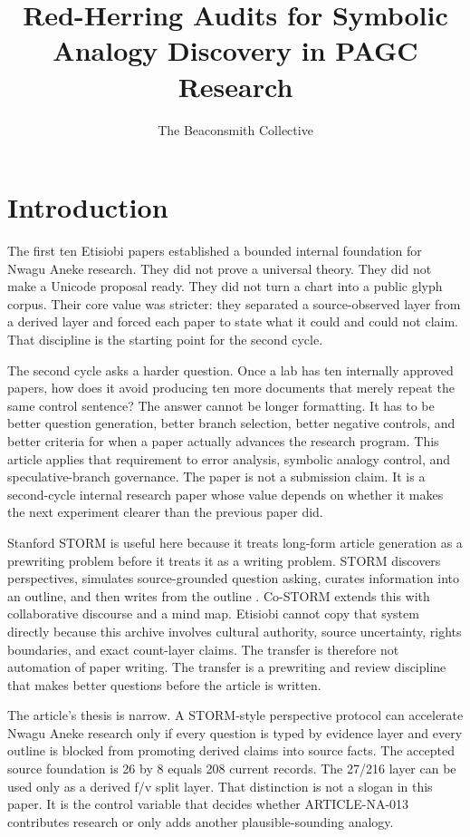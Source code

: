 \documentclass[sigconf,nonacm]{acmart}
\title{Red-Herring Audits for Symbolic Analogy Discovery in PAGC Research}
\author{The Beaconsmith Collective}
\affiliation{\institution{Etisiobi Research Studio}\city{Enugu}\country{Nigeria}}
\begin{document}
\maketitle

\section{Introduction}
The first ten Etisiobi papers established a bounded internal foundation for
Nwagu Aneke research. They did not prove a universal theory. They did not make a
Unicode proposal ready. They did not turn a chart into a public glyph corpus.
Their core value was stricter: they separated a source-observed layer from a
derived layer and forced each paper to state what it could and could not claim.
That discipline is the starting point for the second cycle.

The second cycle asks a harder question. Once a lab has ten internally approved
papers, how does it avoid producing ten more documents that merely repeat the
same control sentence? The answer cannot be longer formatting. It has to be
better question generation, better branch selection, better negative controls,
and better criteria for when a paper actually advances the research program.
This article applies that requirement to error analysis, symbolic analogy control, and speculative-branch governance. The paper is not a submission
claim. It is a second-cycle internal research paper whose value depends on
whether it makes the next experiment clearer than the previous paper did.

Stanford STORM is useful here because it treats long-form article generation as
a prewriting problem before it treats it as a writing problem. STORM discovers
perspectives, simulates source-grounded question asking, curates information
into an outline, and then writes from the outline \cite{shao2024storm,jiang2024costorm,gao2023alce,wadden2020scifact}. Co-STORM
extends this with collaborative discourse and a mind map. Etisiobi cannot copy
that system directly because this archive involves cultural authority, source
uncertainty, rights boundaries, and exact count-layer claims. The transfer is
therefore not automation of paper writing. The transfer is a prewriting and
review discipline that makes better questions before the article is written.

The article's thesis is narrow. A STORM-style perspective protocol can accelerate
Nwagu Aneke research only if every question is typed by evidence layer and every
outline is blocked from promoting derived claims into source facts. The accepted
source foundation is 26 by 8 equals 208 current records. The 27/216 layer can be
used only as a derived f/v split layer. That distinction is not a slogan in this
paper. It is the control variable that decides whether ARTICLE-NA-013 contributes
research or only adds another plausible-sounding analogy.
\end{document}
